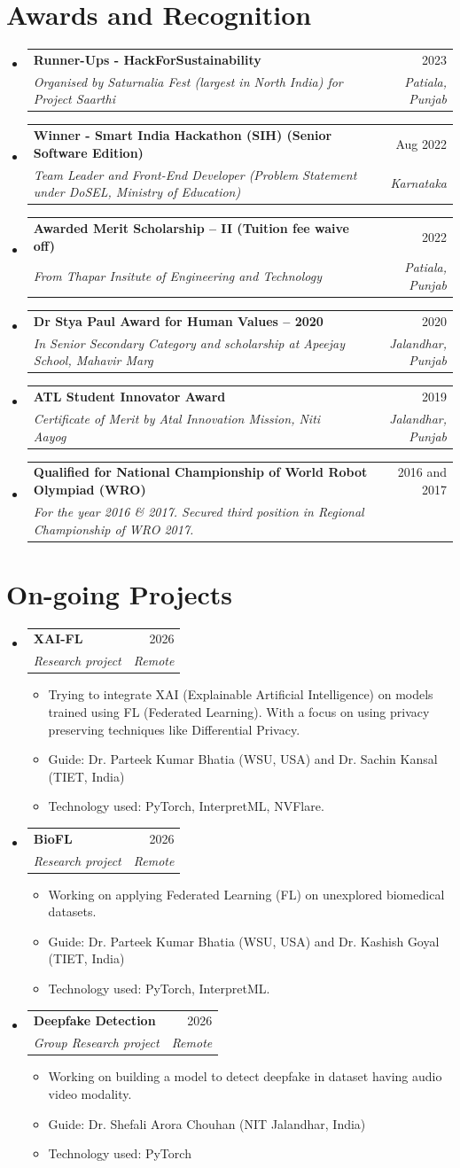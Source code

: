 \documentclass[letterpaper,11pt]{article}
\makeatletter
\newcommand{\resumeItem}[1]{
  \item\small{
    {#1 \vspace{-2pt}}
  }
}
\newcommand{\resumeSubheading}[4]{
  \vspace{-2pt}\item
    \begin{tabular*}{0.97\textwidth}[t]{l@{\extracolsep{\fill}}r}
      \textbf{#1} & #2 \\
      \textit{\small#3} & \textit{\small #4} \\
    \end{tabular*}\vspace{-7pt}
}
\newcommand{\resumeSubHeadingListStart}{\begin{itemize}[leftmargin=0.15in, label={}]}
\newcommand{\resumeSubHeadingListEnd}{\end{itemize}}
\newcommand{\resumeItemListStart}{\begin{itemize}}
\newcommand{\resumeItemListEnd}{\end{itemize}\vspace{-5pt}}
\makeatother
\begin{document}
\section{Awards and Recognition}
  \resumeSubHeadingListStart
      \resumeSubheading
      {Runner-Ups - HackForSustainability}{2023}
      {Organised by Saturnalia Fest (largest in North India) for Project Saarthi}{Patiala, Punjab}
      \resumeSubheading
      {Winner - Smart India Hackathon (SIH) (Senior Software Edition)}{Aug 2022}
      {Team Leader and Front-End Developer (Problem Statement under DoSEL, Ministry of Education)}{Karnataka}
      \resumeSubheading
      {Awarded Merit Scholarship – II (Tuition fee waive off)}{2022}
      {From Thapar Insitute of Engineering and Technology}{Patiala, Punjab}
      \resumeSubheading
      {Dr Stya Paul Award for Human Values – 2020}{2020}
      {In Senior Secondary Category and scholarship at Apeejay School, Mahavir Marg}{Jalandhar, Punjab}
      \resumeSubheading
      {ATL Student Innovator Award}{2019}
      {Certificate of Merit by Atal Innovation Mission, Niti Aayog}{Jalandhar, Punjab}
      \resumeSubheading
      {Qualified for National Championship of World Robot Olympiad (WRO)}{2016 and 2017}
      {For the year 2016 \& 2017. Secured third position in Regional Championship of WRO 2017.}{}
    \resumeSubHeadingListEnd

\section{On-going Projects}
  \resumeSubHeadingListStart
      \resumeSubheading
      {XAI-FL}{2026}
      {Research project}{Remote}
            \resumeItemListStart
                \resumeItem{Trying to integrate XAI (Explainable Artificial Intelligence) on models trained using FL (Federated Learning). With a focus on using privacy preserving techniques like Differential Privacy.}
                \resumeItem{Guide: Dr. Parteek Kumar Bhatia (WSU, USA) and Dr. Sachin Kansal (TIET, India)}
                \resumeItem{Technology used: PyTorch, InterpretML, NVFlare.}
              \resumeItemListEnd
            \resumeSubheading
      {BioFL}{2026}
      {Research project}{Remote}
            \resumeItemListStart
                \resumeItem{Working on applying Federated Learning (FL) on unexplored biomedical datasets.}
                \resumeItem{Guide: Dr. Parteek Kumar Bhatia (WSU, USA) and Dr. Kashish Goyal (TIET, India)}
                \resumeItem{Technology used: PyTorch, InterpretML.}
              \resumeItemListEnd
            \resumeSubheading
      {Deepfake Detection}{2026}
      {Group Research project}{Remote}
            \resumeItemListStart
                \resumeItem{Working on building a model to detect deepfake in dataset having audio video modality.}
                \resumeItem{Guide: Dr. Shefali Arora Chouhan (NIT Jalandhar, India)}
                \resumeItem{Technology used: PyTorch}
              \resumeItemListEnd
          \resumeSubHeadingListEnd
\end{document}
